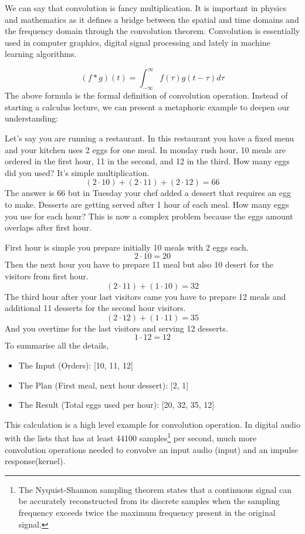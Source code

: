             We can say that convolution is fancy multiplication\cite{Guide_to_Convolution}. It is important in physics and mathematics as it defines a bridge between the spatial and time domains and the frequency domain through the convolution theorem. Convolution is essentially used in computer graphics, digital signal processing and lately in machine learning algorithms.\par
            $$(f \ast g)(t)=\int_{-\infty}^{\infty} f(\tau) g(t-\tau) d \tau$$
            The above formula is the formal definition of convolution operation. Instead of starting a calculus lecture, we can present a metaphoric example to deepen our understanding:\par

            Let's say you are running a restaurant. In this restaurant you have a fixed menu and your kitchen uses 2 eggs for one meal. In monday rush hour, 10 meals are ordered in the first hour, 11 in the second, and 12 in the third. How many eggs did you used? It's simple multiplication. 
            $$(2\cdot10)+(2\cdot11)+(2\cdot12)=66$$
            The answer is 66 but in Tuesday your chef added a dessert that requires an egg to make. Desserts are getting served after 1 hour of each meal. How many eggs you use for each hour? This is now a complex problem because the eggs amount overlaps after first hour.

            First hour is simple you prepare initially 10 meals with 2 eggs each. 
            $$2\cdot10=20$$
            Then the next hour you have to prepare 11 meal but also 10 desert for the visitors from first hour.
            $$(2\cdot11)+(1\cdot10)=32$$
            The third hour after your last visitors came you have to prepare 12 meals and additional 11 desserts for the second hour visitors.
            $$(2\cdot12)+(1\cdot11)=35$$
            And you overtime for the last visitors and serving 12 desserts.
            $$1\cdot12=12$$
            To summarise all the details,\par
            \begin{itemize}
                \item The Input (Orders): [10, 11, 12]
                \item The Plan (First meal, next hour dessert): [2, 1]
                \item The Result (Total eggs used per hour): [20, 32, 35, 12]
            \end{itemize}
            This calculation is a high level example for convolution operation. In digital audio with the lists that has at least 44100 samples\footnote{The Nyquist-Shannon sampling theorem states that a continuous signal can be accurately reconstructed from its discrete samples when the sampling frequency exceeds twice the maximum frequency present in the original signal\cite{Digital_Audio_Theory}.} per second, much more convolution operations needed to convolve an input audio (input) and an impulse response(kernel).\par

